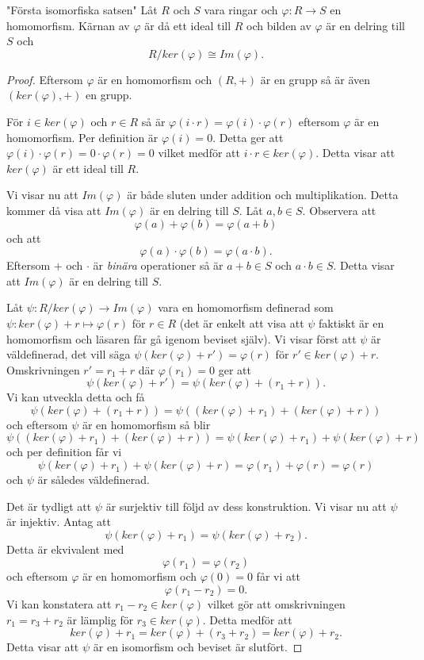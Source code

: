 \documentclass{article}
\theoremstyle{definition}
\begin{document}
\hypertarget{isomorfiska}{}
\begin{mytheo}{"Första isomorfiska satsen"}{}
  Låt $R$ och $S$ vara ringar och $\varphi: R \rightarrow S$ en homomorfism. Kärnan av $\varphi$ är då ett ideal till $R$ och bilden av $\varphi$ är en 
  delring till $S$ och 
  \[R/ker(\varphi) \cong Im(\varphi).\]
\end{mytheo}
\begin{proof}
  Eftersom $\varphi$ är en homomorfism och $(R, +)$ är en grupp så är även $(ker(\varphi), +)$ en grupp. 

  För $i \in ker(\varphi)$ och $r \in R$ så är $\varphi(i \cdot r) = \varphi(i) \cdot \varphi(r)$ eftersom $\varphi$ är en homomorfism. 
  Per definition är $\varphi(i) = 0$. Detta ger att $\varphi(i) \cdot \varphi(r) = 0 \cdot \varphi(r) = 0$ vilket medför att $i \cdot r \in ker(\varphi)$.
  Detta visar att $ker(\varphi)$ är ett ideal till $R$.

  Vi visar nu att $Im(\varphi)$ är både sluten under addition och multiplikation. Detta kommer då visa att $Im(\varphi)$ är en delring till $S$.
  Låt $a, b \in S$. Observera att 
  \[\varphi(a) + \varphi(b) = \varphi(a + b)\]
  och att 
  \[\varphi(a) \cdot \varphi(b) = \varphi(a \cdot b).\]
  Eftersom $+$ och $\cdot$ är \textit{binära} operationer så är $a + b \in S$ och $a \cdot b \in S$. Detta visar att $Im(\varphi)$ är en delring till $S$.

  Låt $\psi: R/ker(\varphi) \rightarrow Im(\varphi)$ vara en homomorfism definerad som $\psi: ker(\varphi) + r \mapsto \varphi(r)$ för $r \in R$ 
  (det är enkelt att visa att $\psi$ faktiskt är en homomorfism och läsaren får gå igenom beviset själv). Vi visar först 
  att $\psi$ är väldefinerad, det vill säga $\psi(ker(\varphi) + r') = \varphi(r)$ för $r' \in ker(\varphi) + r.$ Omskrivningen 
  $r' = r_1 + r$ där $\varphi(r_1) = 0$ ger att 
  \[\psi(ker(\varphi) + r') = \psi(ker(\varphi) + (r_1+r)).\]
  Vi kan utveckla detta och få
  \[\psi(ker(\varphi) + (r_1+r)) = \psi((ker(\varphi) + r_1) + (ker(\varphi) + r))\]
  och eftersom $\psi$ är en homomorfism så blir 
  \[\psi((ker(\varphi) + r_1) + (ker(\varphi) + r)) = \psi(ker(\varphi) + r_1) + \psi(ker(\varphi) + r)\]
  och per definition får vi
  \[\psi(ker(\varphi) + r_1) + \psi(ker(\varphi) + r) = \varphi(r_1) + \varphi(r) = \varphi(r)\]
  och $\psi$ är således väldefinerad.

  Det är tydligt att $\psi$ är surjektiv till följd av dess konstruktion. Vi visar nu att $\psi$ är injektiv. Antag att 
  \[\psi(ker(\varphi) + r_1) = \psi(ker(\varphi) + r_2).\]
  Detta är ekvivalent med 
  \[\varphi(r_1) = \varphi(r_2)\]
  och eftersom $\varphi$ är en homomorfism och $\varphi(0) = 0$ får vi att 
  \[\varphi(r_1 - r_2) = 0.\]
  Vi kan konstatera att $r_1 - r_2 \in ker(\varphi)$ vilket gör att omskrivningen $r_1 = r_3 + r_2$ är lämplig för $r_3 \in ker(\varphi)$.
  Detta medför att 
  \[ker(\varphi) + r_1 = ker(\varphi) + (r_3 + r_2) = ker(\varphi) + r_2.\]
  Detta visar att $\psi$ är en isomorfism och beviset är slutfört.
\end{proof}
\end{document}
